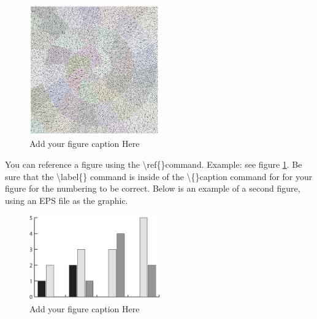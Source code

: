 \documentclass{csmagazine}
\begin{document}

\begin{figure}[H]
	\begin{center}	
		\includegraphics[width=0.5\textwidth]{figure_1.jpg}
		\caption{Add your figure caption Here \label{fig:example_fig}}		
	\end{center}
\end{figure}


You can reference a figure using the \textbackslash{}ref\{\}command. Example: see figure \ref{fig:example_fig}. Be sure that the \textbackslash{}label\{\} command is inside of the \textbackslash{}\{\}caption command for for your figure for the numbering to be correct. Below is an example of a second figure, using an EPS file as the graphic.


\begin{figure}[H]
	\begin{center}	
		\includegraphics[width=0.5\textwidth]{figure_2.eps}
		\caption{Add your figure caption Here \label{fig:example_fig2}}		
	\end{center}
\end{figure}
\end{document}
